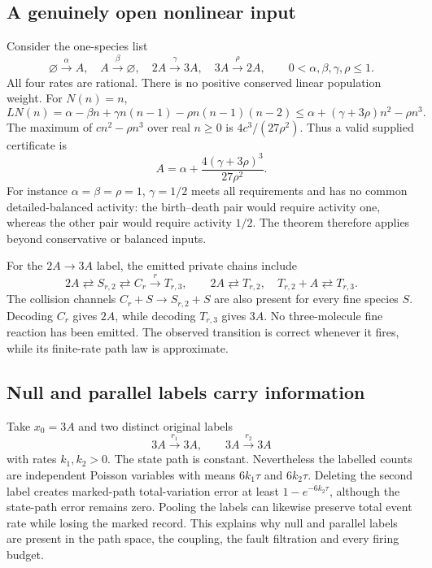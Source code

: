 \documentclass[11pt,reqno]{amsart}
\theoremstyle{definition}
\theoremstyle{remark}
\begin{document}
\subsection{A genuinely open nonlinear input}
Consider the one-species list
\begin{equation}\label{eq:open-example}
 \varnothing\xrightarrow{\alpha}A,\quad
 A\xrightarrow{\beta}\varnothing,\quad
 2A\xrightarrow{\gamma}3A,\quad
 3A\xrightarrow{\rho}2A,
 \qquad 0<\alpha,\beta,\gamma,\rho\le1.
\end{equation}
All four rates are rational. There is no positive conserved linear population
weight. For $N(n)=n$,
\[
 LN(n)=\alpha-\beta n+\gamma n(n-1)-\rho n(n-1)(n-2)
 \le\alpha+(\gamma+3\rho)n^2-\rho n^3.
\]
The maximum of $cn^2-\rho n^3$ over real $n\ge0$ is $4c^3/(27\rho^2)$.
Thus a valid supplied certificate is
\begin{equation}\label{eq:example-A}
 A=\alpha+\frac{4(\gamma+3\rho)^3}{27\rho^2}.
\end{equation}
For instance $\alpha=\beta=\rho=1$, $\gamma=1/2$ meets all requirements and
has no common detailed-balanced activity: the birth--death pair would require
activity one, whereas the other pair would require activity $1/2$.
The theorem therefore applies beyond conservative or balanced inputs.

For the $2A\to3A$ label, the emitted private chains include
\[
 2A\rightleftarrows S_{r,2}\rightleftarrows C_r
 \xrightarrow{r}T_{r,3},\qquad
 2A\rightleftarrows T_{r,2},\quad
 T_{r,2}+A\rightleftarrows T_{r,3}.
\]
The collision channels $C_r+S\to S_{r,2}+S$ are also present for every fine
species $S$. Decoding $C_r$ gives $2A$, while decoding $T_{r,3}$ gives $3A$.
No three-molecule fine reaction has been emitted. The observed transition is
correct whenever it fires, while its finite-rate path law is approximate.

\subsection{Null and parallel labels carry information}
Take $x_0=3A$ and two distinct original labels
\[
 3A\xrightarrow{r_1}3A,\qquad 3A\xrightarrow{r_2}3A
\]
with rates $k_1,k_2>0$. The state path is constant. Nevertheless the labelled
counts are independent Poisson variables with means $6k_1\tau$ and
$6k_2\tau$. Deleting the second label creates marked-path total-variation
error at least $1-e^{-6k_2\tau}$, although the state-path error remains zero.
Pooling the labels can likewise preserve total event rate while losing the
marked record. This explains why null and parallel labels are present in the
path space, the coupling, the fault filtration and every firing budget.
\end{document}

